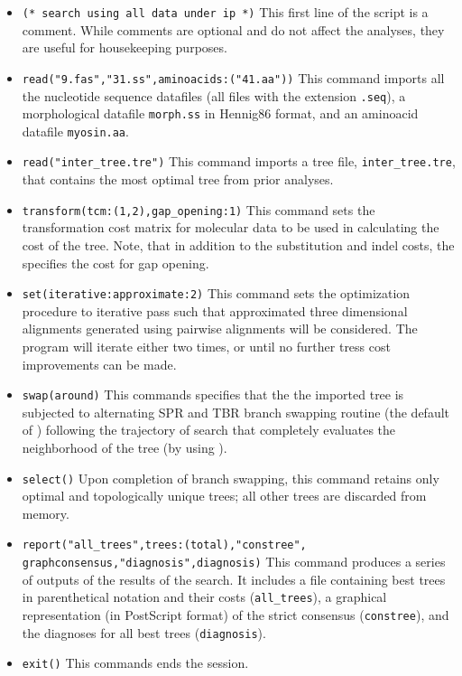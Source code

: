 \begin{itemize}
\item \texttt{(* search using all data under ip *)} This first line of the script is a comment. While comments are 
optional and do not affect the analyses, they are useful for housekeeping purposes.
\item \texttt{read("9.fas","31.ss",aminoacids:("41.aa"))} This command imports all the nucleotide sequence 
datafiles (all files with the extension \texttt{.seq}), a morphological datafile \texttt{morph.ss} in Hennig86 format, 
and an aminoacid datafile \texttt{myosin.aa}.
\item \texttt{read("inter\_tree.tre")} This command imports a tree file, \texttt{inter\_tree.tre}, that contains the most 
optimal tree from prior analyses. 
\item \texttt{transform(tcm:(1,2),gap\_opening:1)} This command sets the transformation cost matrix for molecular 
data to be used in calculating the cost of the tree. Note, that in addition to the substitution and indel costs, the 
 specifies the cost for gap opening.
\item \texttt{set(iterative:approximate:2)} This command sets the optimization procedure
    to iterative pass such that approximated three dimensional alignments generated using pairwise alignments 
    will be considered.  The program will iterate either two times, or until no further tress cost improvements can 
    be made.
\item \texttt{swap(around)} This commands specifies that the the imported tree is subjected to alternating SPR 
and TBR branch swapping routine (the default of \poy) following the trajectory of search that completely 
evaluates the neighborhood of the tree (by using ).
\item \texttt{select()} Upon completion of branch swapping, this command retains only optimal and topologically 
unique trees; all other trees are discarded from memory.
\item \texttt{report("all\_trees",trees:(total),"constree",\\graphconsensus,"diagnosis",diagnosis)} This command 
produces a series of outputs of the results of the search. It includes a file containing best trees in parenthetical 
notation and their costs (\texttt{all\_trees}), a graphical representation (in PostScript format) of the strict 
consensus (\texttt{constree}), and the diagnoses for all best trees (\texttt{diagnosis}).
\item \texttt{exit()} This commands ends the \poy session.
\end{itemize}


